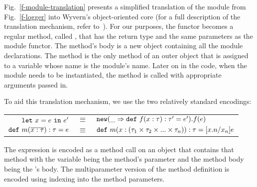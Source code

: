 Fig.~\ref{f-module-translation} presents a simplified translation of the  module from Fig.~\ref{f-logger} into Wyvern's object-oriented core (for a full description of the translation mechanism, refer to~\cite{melicher17}). For our purposes, the functor becomes a regular method, called , that has the return type  and the same parameters as the module functor. The method's body is a new object containing all the module declarations. The  method is the only method of an outer object that is assigned to a variable whose name is the module's name. Later on in the code, when the  module needs to be instantiated, the  method is called with appropriate arguments passed in.

To aid this translation mechanism, we use the two relatively standard encodings:

\begin{minipage}{\linewidth}
{\small
\begin{tabular}{r@{\hskip 5pt}c@{\hskip 5pt}l}
  $\mathtt{let}~ x = e~\mathtt{in}~ e'$ & $\equiv$ & $\mathtt{new} (\_ \Rightarrow \mathtt{def}~ f(x : \tau) : \tau' = e').f(e)$\\%
  $\mathtt{def}~ m(\overline{x : \tau}) : \tau = e$ & $\equiv$ & $\mathtt{def}~ m(x : (\tau_1 \times \tau_2 \times ... \times \tau_n)) : \tau = [x.n/x_n]e$
\end{tabular}
}
\end{minipage}
The  expression is encoded as a method call on an object that contains that method with the  variable being the method's parameter and the method body being the 's body. The multiparameter version of the method definition is encoded using indexing into the method parameters.



